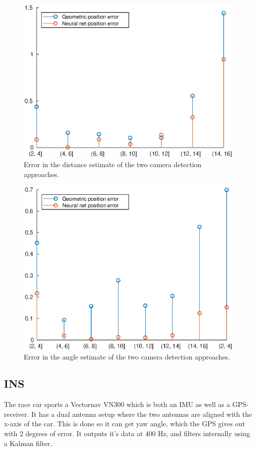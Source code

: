\begin{figure}
    \centering
    \includegraphics[width=0.8\linewidth]{0_Images/3_Theory/camDetection/rErrorCamera.eps}
    \caption[Error in the distance estimate of the two camera detection approaches.]
    {Error in the distance estimate of the two camera detection approaches.}
    \label{Fig:rErrorCamera}
\end{figure}

\begin{figure}
    \centering
    \includegraphics[width=0.8\linewidth]{0_Images/3_Theory/camDetection/psiErrorCamera.eps}
    \caption[Error in the angle estimate of the two camera detection approaches.]
    {Error in the angle estimate of the two camera detection approaches.}
    \label{Fig:psiErrorCamera}
\end{figure}

\subsection{INS}
The race car sports a Vectornav VN300 which is both an IMU as well as a GPS-receiver. It has a dual antenna setup where the two antennas are aligned with the x-axis of the car. This is done so it can get yaw angle, which the GPS gives out with 2 degrees of error. It outputs it's data at 400 Hz, and filters internally using a Kalman filter. 

